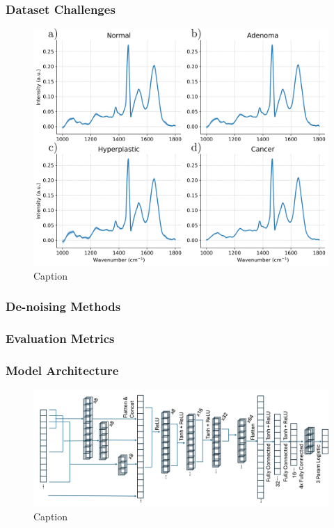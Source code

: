 \subsubsection{Dataset Challenges}
\begin{figure}[htbp]
  \centering
  \includegraphics[width=1\textwidth]{Images/Dataset_Class_Differences.png}
  \caption{Caption}
  \label{fig:my-label}
\end{figure}

\subsubsection{De-noising Methods}
\subsubsection{Evaluation Metrics}

\subsubsection{Model Architecture}
\begin{figure}[htbp]
  \centering
  \includegraphics[width=1\textwidth]{Images/SCNN_TPL_Arch.png}
  \caption{Caption}
  \label{fig:my-label}
\end{figure}

